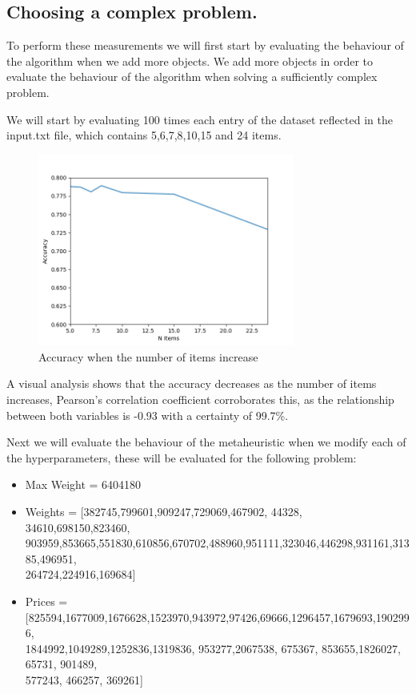 \documentclass{article}
\begin{document}
    \subsection{Choosing a complex problem.}

    To perform these measurements we will first start by evaluating the behaviour of the algorithm when we add more objects.
    We add more objects in order to evaluate the behaviour of the algorithm when solving a sufficiently complex problem.
        
    We will start by evaluating 100 times each entry of the dataset reflected in the input.txt file, which contains 5,6,7,8,10,15 and 24 items.

        \begin{figure}[H]

            \centering
            \includegraphics[width=0.75\textwidth]{../media/ej1/00.accuracy_items_change.png}
            \caption{Accuracy when the number of items increase}
            \label{Accuracy when the number of items increase}

        \end{figure}

        A visual analysis shows that the accuracy decreases as the number of items increases,
        Pearson's correlation coefficient corroborates this, as the relationship between both variables 
        is -0.93 with a certainty of 99.7\%.

        Next we will evaluate the behaviour of the metaheuristic when we modify each of the hyperparameters, 
        these will be evaluated for the following problem:

        \begin{itemize}
            \item Max Weight = 6404180
            \item Weights = [382745,799601,909247,729069,467902, 44328, 34610,698150,823460,\\
            903959,853665,551830,610856,670702,488960,951111,323046,446298,931161,31385,496951,\\
            264724,224916,169684]
            \item Prices = [825594,1677009,1676628,1523970,943972,97426,69666,1296457,1679693,1902996,\\
            1844992,1049289,1252836,1319836, 953277,2067538, 675367, 853655,1826027,  65731, 901489,\\
             577243, 466257, 369261]
        \end{itemize}
\end{document}
